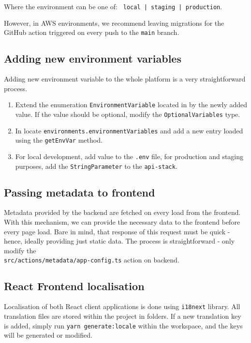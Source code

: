 Where the environment can be one of: \texttt{ local | staging | production}.

However, in AWS environments, we recommend leaving migrations for the GitHub action triggered on every push to the \texttt{main} branch.


\subsection{Adding new environment variables}
Adding new environment variable to the whole platform is a very straightforward process.
\begin{enumerate}
    \item Extend the enumeration \texttt{EnvironmentVariable} located in  by the newly added value. If the value should be optional, modify the \texttt{OptionalVariables} type.
    \item In  locate \texttt{environments.environmentVariables} and add a new entry loaded using the \texttt{getEnvVar} method.
    \item For local development, add value to the \texttt{.env} file, for production and staging purposes, add the \texttt{StringParameter} to the \texttt{api-stack}.
\end{enumerate}

\subsection{Passing metadata to frontend}
Metadata provided by the backend are fetched on every load from the frontend.
With this mechanism, we can provide the necessary data to the frontend before every page load.
Bare in mind, that response of this request must be quick - hence, ideally providing just static data. 
The process is straightforward - only modify the \\ \texttt{src/actions/metadata/app-config.ts} action on backend.

\subsection{React Frontend localisation}
Localisation of both React client applications is done using \texttt{i18next} library.  
All translation files are stored within the project in  folders.
If a new translation key is added, simply run \texttt{yarn generate:locale} within the workspace, and the keys will be generated or modified. 

